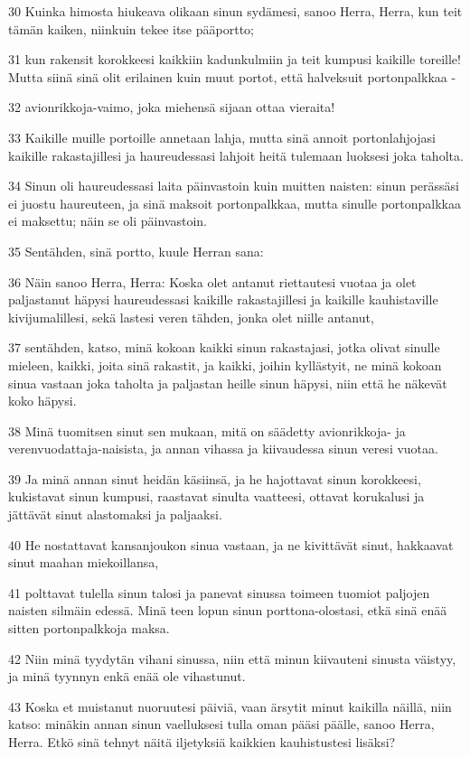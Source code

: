 \par 30 Kuinka himosta hiukeava olikaan sinun sydämesi, sanoo Herra, Herra, kun teit tämän kaiken, niinkuin tekee itse pääportto;
\par 31 kun rakensit korokkeesi kaikkiin kadunkulmiin ja teit kumpusi kaikille toreille! Mutta siinä sinä olit erilainen kuin muut portot, että halveksuit portonpalkkaa -
\par 32 avionrikkoja-vaimo, joka miehensä sijaan ottaa vieraita!
\par 33 Kaikille muille portoille annetaan lahja, mutta sinä annoit portonlahjojasi kaikille rakastajillesi ja haureudessasi lahjoit heitä tulemaan luoksesi joka taholta.
\par 34 Sinun oli haureudessasi laita päinvastoin kuin muitten naisten: sinun perässäsi ei juostu haureuteen, ja sinä maksoit portonpalkkaa, mutta sinulle portonpalkkaa ei maksettu; näin se oli päinvastoin.
\par 35 Sentähden, sinä portto, kuule Herran sana:
\par 36 Näin sanoo Herra, Herra: Koska olet antanut riettautesi vuotaa ja olet paljastanut häpysi haureudessasi kaikille rakastajillesi ja kaikille kauhistaville kivijumalillesi, sekä lastesi veren tähden, jonka olet niille antanut,
\par 37 sentähden, katso, minä kokoan kaikki sinun rakastajasi, jotka olivat sinulle mieleen, kaikki, joita sinä rakastit, ja kaikki, joihin kyllästyit, ne minä kokoan sinua vastaan joka taholta ja paljastan heille sinun häpysi, niin että he näkevät koko häpysi.
\par 38 Minä tuomitsen sinut sen mukaan, mitä on säädetty avionrikkoja- ja verenvuodattaja-naisista, ja annan vihassa ja kiivaudessa sinun veresi vuotaa.
\par 39 Ja minä annan sinut heidän käsiinsä, ja he hajottavat sinun korokkeesi, kukistavat sinun kumpusi, raastavat sinulta vaatteesi, ottavat korukalusi ja jättävät sinut alastomaksi ja paljaaksi.
\par 40 He nostattavat kansanjoukon sinua vastaan, ja ne kivittävät sinut, hakkaavat sinut maahan miekoillansa,
\par 41 polttavat tulella sinun talosi ja panevat sinussa toimeen tuomiot paljojen naisten silmäin edessä. Minä teen lopun sinun porttona-olostasi, etkä sinä enää sitten portonpalkkoja maksa.
\par 42 Niin minä tyydytän vihani sinussa, niin että minun kiivauteni sinusta väistyy, ja minä tyynnyn enkä enää ole vihastunut.
\par 43 Koska et muistanut nuoruutesi päiviä, vaan ärsytit minut kaikilla näillä, niin katso: minäkin annan sinun vaelluksesi tulla oman pääsi päälle, sanoo Herra, Herra. Etkö sinä tehnyt näitä iljetyksiä kaikkien kauhistustesi lisäksi?
